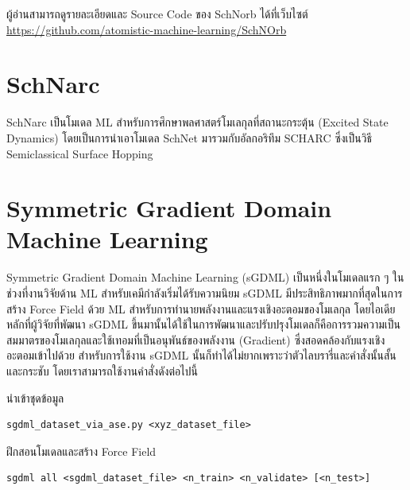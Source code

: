 ผู้อ่านสามารถดูรายละเอียดและ Source Code ของ SchNorb ได้ที่เว็บไซต์ \url{https://github.com/atomistic-machine-learning/SchNOrb}

\section{SchNarc}
\label{sec:schnarc}

SchNarc เป็นโมเดล ML สำหรับการศึกษาพลศาสตร์โมเลกุลที่สถานะกระตุ้น (Excited State Dynamics)\autocite{westermayr2020} โดยเป็นการนำเอาโมเดล SchNet\autocite{schutt2017,schutt2018} มารวมกับอัลกอริทึม SCHARC\autocite{richter2011,mai2018} ซึ่งเป็นวิธี Semiclassical Surface Hopping

\section{Symmetric Gradient Domain Machine Learning}
\label{sec:sgdml}

Symmetric Gradient Domain Machine Learning (sGDML) เป็นหนึ่งในโมเดลแรก ๆ ในช่วงที่งานวิจัยด้าน ML สำหรับเคมีกำลังเริ่มได้รับความนิยม sGDML มีประสิทธิภาพมากที่สุดในการสร้าง Force Field ด้วย ML สำหรับการทำนายพลังงานและแรงเชิงอะตอมของโมเลกุล\autocite{chmiela2017,chmiela2018,sauceda2020,chmiela2020,chmiela2022} โดยไอเดียหลักที่ผู้วิจัยที่พัฒนา sGDML ขึ้นมานั้นได้ใช้ในการพัฒนาและปรับปรุงโมเดลก็คือการรวมความเป็นสมมาตรของโมเลกุลและใช้เทอมที่เป็นอนุพันธ์ของพลังงาน (Gradient) ซึ่งสอดคล้องกับแรงเชิงอะตอมเข้าไปด้วย สำหรับการใช้งาน sGDML นั้นก็ทำได้ไม่ยากเพราะว่าตัวไลบรารี่และคำสั่งนั้นสั้นและกระชับ โดยเราสามารถใช้งานคำสั่งดังต่อไปนี้

นำเข้าชุดข้อมูล

\begin{lstlisting}[style=MyBash]
sgdml_dataset_via_ase.py <xyz_dataset_file>
\end{lstlisting}

\vspace{1em}

ฝึกสอนโมเดลและสร้าง Force Field

\begin{lstlisting}[style=MyBash]
sgdml all <sgdml_dataset_file> <n_train> <n_validate> [<n_test>]
\end{lstlisting}

\vspace{1em}

